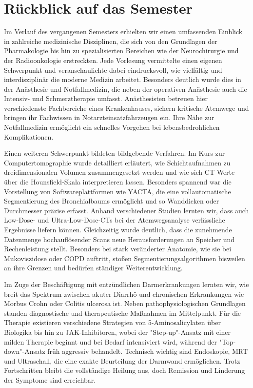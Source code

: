 \documentclass{article}
\begin{document}
\section*{Rückblick auf das Semester}
Im Verlauf des vergangenen Semesters erhielten wir einen umfassenden Einblick in zahlreiche medizinische Disziplinen, die sich von den Grundlagen der Pharmakologie bis hin zu spezialisierten Bereichen wie der Neurochirurgie und der Radioonkologie erstreckten. Jede Vorlesung vermittelte einen eigenen Schwerpunkt und veranschaulichte dabei eindrucksvoll, wie vielfältig und interdisziplinär die moderne Medizin arbeitet. Besonders deutlich wurde dies in der Anästhesie und Notfallmedizin, die neben der operativen Anästhesie auch die Intensiv- und Schmerztherapie umfasst. Anästhesisten betreuen hier verschiedenste Fachbereiche eines Krankenhauses, sichern kritische Atemwege und bringen ihr Fachwissen in Notarzteinsatzfahrzeugen ein. Ihre Nähe zur Notfallmedizin ermöglicht ein schnelles Vorgehen bei lebensbedrohlichen Komplikationen.

Einen weiteren Schwerpunkt bildeten bildgebende Verfahren. Im Kurs zur Computertomographie wurde detailliert erläutert, wie Schichtaufnahmen zu dreidimensionalen Volumen zusammengesetzt werden und wie sich CT-Werte über die Hounsfield-Skala interpretieren lassen. Besonders spannend war die Vorstellung von Softwareplattformen wie YACTA, die eine vollautomatische Segmentierung des Bronchialbaums ermöglicht und so Wanddicken oder Durchmesser präzise erfasst. Anhand verschiedener Studien lernten wir, dass auch Low-Dose- und Ultra-Low-Dose-CTs bei der Atemwegsanalyse verlässliche Ergebnisse liefern können. Gleichzeitig wurde deutlich, dass die zunehmende Datenmenge hochauflösender Scans neue Herausforderungen an Speicher und Rechenleistung stellt. Besonders bei stark veränderter Anatomie, wie sie bei Mukoviszidose oder COPD auftritt, stoßen Segmentierungsalgorithmen bisweilen an ihre Grenzen und bedürfen ständiger Weiterentwicklung.

Im Zuge der Beschäftigung mit entzündlichen Darmerkrankungen lernten wir, wie breit das Spektrum zwischen akuter Diarrhö und chronischen Erkrankungen wie Morbus Crohn oder Colitis ulcerosa ist. Neben pathophysiologischen Grundlagen standen diagnostische und therapeutische Maßnahmen im Mittelpunkt. Für die Therapie existieren verschiedene Strategien von 5-Aminosalicylaten über Biologika bis hin zu JAK-Inhibitoren, wobei der "Step-up"-Ansatz mit einer milden Therapie beginnt und bei Bedarf intensiviert wird, während der "Top-down"-Ansatz früh aggressiv behandelt. Technisch wichtig sind Endoskopie, MRT und Ultraschall, die eine exakte Beurteilung der Darmwand ermöglichen. Trotz Fortschritten bleibt die vollständige Heilung aus, doch Remission und Linderung der Symptome sind erreichbar.
\end{document}
